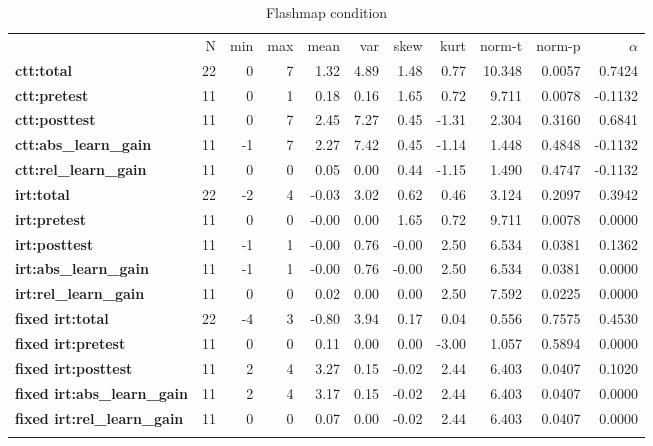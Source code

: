 \begin{longtable}[c]{@{}lrrrrrrrrrr@{}}
\caption{Flashmap condition}
\endfirsthead
\endhead
\toprule\addlinespace
& N & min & max & mean & var & skew & kurt & norm-t &
norm-p & $\alpha$
\\\addlinespace
\midrule
\textbf{ctt:total} & 22 & 0 & 7 & 1.32 & 4.89 & 1.48 & 0.77 & 10.348 &
0.0057 & 0.7424
\\\addlinespace
\textbf{ctt:pretest} & 11 & 0 & 1 & 0.18 & 0.16 & 1.65 & 0.72 & 9.711 &
0.0078 & -0.1132
\\\addlinespace
\textbf{ctt:posttest} & 11 & 0 & 7 & 2.45 & 7.27 & 0.45 & -1.31 & 2.304
& 0.3160 & 0.6841
\\\addlinespace
\textbf{ctt:abs\_learn\_gain} & 11 & -1 & 7 & 2.27 & 7.42 & 0.45 & -1.14
& 1.448 & 0.4848 & -0.1132
\\\addlinespace
\textbf{ctt:rel\_learn\_gain} & 11 & 0 & 0 & 0.05 & 0.00 & 0.44 & -1.15
& 1.490 & 0.4747 & -0.1132
\\\addlinespace
\textbf{irt:total} & 22 & -2 & 4 & -0.03 & 3.02 & 0.62 & 0.46 & 3.124 &
0.2097 & 0.3942
\\\addlinespace
\textbf{irt:pretest} & 11 & 0 & 0 & -0.00 & 0.00 & 1.65 & 0.72 & 9.711 &
0.0078 & 0.0000
\\\addlinespace
\textbf{irt:posttest} & 11 & -1 & 1 & -0.00 & 0.76 & -0.00 & 2.50 &
6.534 & 0.0381 & 0.1362
\\\addlinespace
\textbf{irt:abs\_learn\_gain} & 11 & -1 & 1 & -0.00 & 0.76 & -0.00 &
2.50 & 6.534 & 0.0381 & 0.0000
\\\addlinespace
\textbf{irt:rel\_learn\_gain} & 11 & 0 & 0 & 0.02 & 0.00 & 0.00 & 2.50 &
7.592 & 0.0225 & 0.0000
\\\addlinespace
\textbf{fixed irt:total} & 22 & -4 & 3 & -0.80 & 3.94 & 0.17 & 0.04 &
0.556 & 0.7575 & 0.4530
\\\addlinespace
\textbf{fixed irt:pretest} & 11 & 0 & 0 & 0.11 & 0.00 & 0.00 & -3.00
& 1.057 & 0.5894 & 0.0000
\\\addlinespace
\textbf{fixed irt:posttest} & 11 & 2 & 4 & 3.27 & 0.15 & -0.02 & 2.44
& 6.403 & 0.0407 & 0.1020
\\\addlinespace
\textbf{fixed irt:abs\_learn\_gain} & 11 & 2 & 4 & 3.17 & 0.15 &
-0.02 & 2.44 & 6.403 & 0.0407 & 0.0000
\\\addlinespace
\textbf{fixed irt:rel\_learn\_gain} & 11 & 0 & 0 & 0.07 & 0.00 &
-0.02 & 2.44 & 6.403 & 0.0407 & 0.0000
\\\addlinespace
\bottomrule
    \label{tab:know_fm}
\end{longtable}

